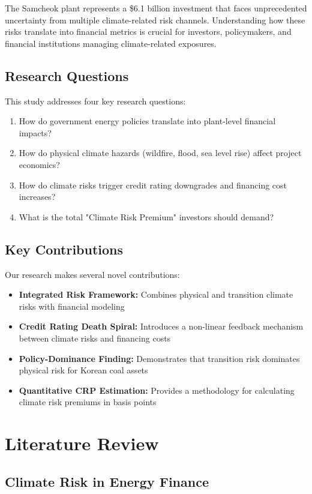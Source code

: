 \documentclass[11pt,a4paper]{article}
\begin{document}
The Samcheok plant represents a \$6.1 billion investment that faces unprecedented uncertainty from multiple climate-related risk channels. Understanding how these risks translate into financial metrics is crucial for investors, policymakers, and financial institutions managing climate-related exposures.

\subsection{Research Questions}

This study addresses four key research questions:
\begin{enumerate}
\item How do government energy policies translate into plant-level financial impacts?
\item How do physical climate hazards (wildfire, flood, sea level rise) affect project economics?
\item How do climate risks trigger credit rating downgrades and financing cost increases?
\item What is the total "Climate Risk Premium" investors should demand?
\end{enumerate}

\subsection{Key Contributions}

Our research makes several novel contributions:
\begin{itemize}
\item \textbf{Integrated Risk Framework:} Combines physical and transition climate risks with financial modeling
\item \textbf{Credit Rating Death Spiral:} Introduces a non-linear feedback mechanism between climate risks and financing costs
\item \textbf{Policy-Dominance Finding:} Demonstrates that transition risk dominates physical risk for Korean coal assets
\item \textbf{Quantitative CRP Estimation:} Provides a methodology for calculating climate risk premiums in basis points
\end{itemize}

\section{Literature Review}

\subsection{Climate Risk in Energy Finance}
\end{document}
